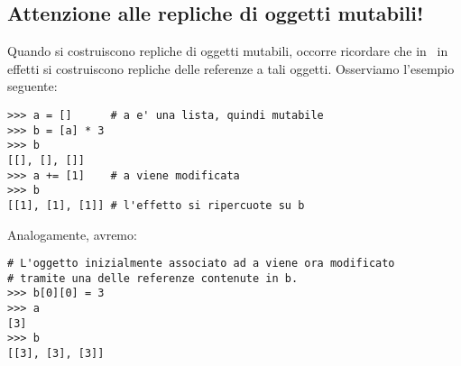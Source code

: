 \subsection{Attenzione alle repliche di oggetti mutabili!}

Quando si costruiscono repliche di oggetti mutabili, occorre ricordare
che in \python\ in effetti si costruiscono repliche delle referenze a
tali oggetti. Osserviamo l'esempio seguente:
\begin{verbatim}
>>> a = []      # a e' una lista, quindi mutabile
>>> b = [a] * 3
>>> b
[[], [], []]
>>> a += [1]    # a viene modificata
>>> b
[[1], [1], [1]] # l'effetto si ripercuote su b
\end{verbatim}
Analogamente, avremo:
\begin{verbatim}
# L'oggetto inizialmente associato ad a viene ora modificato
# tramite una delle referenze contenute in b.
>>> b[0][0] = 3
>>> a
[3]
>>> b
[[3], [3], [3]]
\end{verbatim}

